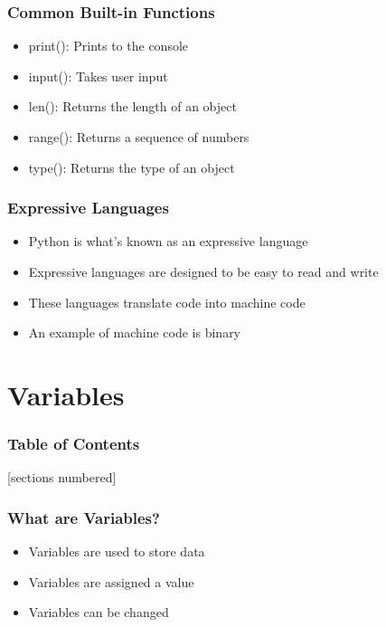 \documentclass[serif, 9pt, aspectratio=32]{beamer}
\begin{document}
\begin{frame}
    \centering
    \frametitle{Common Built-in Functions}
    \begin{itemize}
        \setlength{\itemsep}{3em}
        \item print(): Prints to the console
        \item input(): Takes user input
        \item len(): Returns the length of an object
        \item range(): Returns a sequence of numbers
        \item type(): Returns the type of an object
    \end{itemize}
\end{frame}

\begin{frame}
    \centering
    \frametitle{Expressive Languages}
    \begin{itemize}
        \setlength{\itemsep}{3em}
        \item Python is what's known as an expressive language
        \item Expressive languages are designed to be easy to read and write
        \item These languages translate code into machine code
        \item An example of machine code is binary
    \end{itemize}
\end{frame}

\section{Variables}

\begin{frame}
    \frametitle{Table of Contents}
    [sections numbered]
    \tableofcontents[currentsection]
\end{frame}

\begin{frame}
    \centering
    \frametitle{What are Variables?}
    \begin{itemize}
        \setlength{\itemsep}{3em}
        \item Variables are used to store data
        \item Variables are assigned a value
        \item Variables can be changed
    \end{itemize}
\end{frame}
\end{document}
